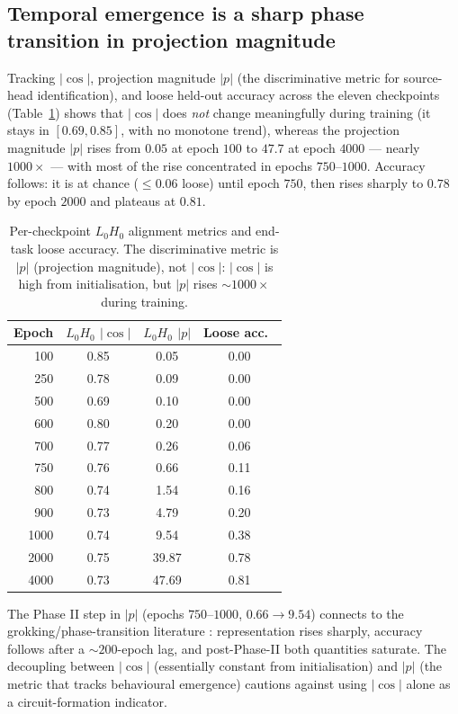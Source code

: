 \documentclass{article}
\theoremstyle{plain}
\theoremstyle{definition}
\begin{document}
\subsection{Temporal emergence is a sharp phase transition in projection magnitude}
\label{sec:emergence}

Tracking $|\cos|$, projection magnitude $|p|$ (the discriminative metric for source-head identification), and loose held-out accuracy across the eleven checkpoints (Table~\ref{tab:temporal}) shows that $|\cos|$ does \emph{not} change meaningfully during training (it stays in $[0.69, 0.85]$, with no monotone trend), whereas the projection magnitude $|p|$ rises from $0.05$ at epoch $100$ to $47.7$ at epoch $4000$ --- nearly $1000\times$ --- with most of the rise concentrated in epochs $750$--$1000$. Accuracy follows: it is at chance ($\leq 0.06$ loose) until epoch $750$, then rises sharply to $0.78$ by epoch $2000$ and plateaus at $0.81$.

\begin{table}[t]
\centering
\small
\caption{Per-checkpoint $L_0H_0$ alignment metrics and end-task loose accuracy. The discriminative metric is $|p|$ (projection magnitude), not $|\cos|$: $|\cos|$ is high from initialisation, but $|p|$ rises $\sim\!1000\times$ during training.}
\label{tab:temporal}
\begin{tabular}{rccc}
\toprule
Epoch & $L_0H_0$ $|\cos|$ & $L_0H_0$ $|p|$ & Loose acc.\ \\
\midrule
100  & 0.85 &  0.05 & 0.00 \\
250  & 0.78 &  0.09 & 0.00 \\
500  & 0.69 &  0.10 & 0.00 \\
600  & 0.80 &  0.20 & 0.00 \\
700  & 0.77 &  0.26 & 0.06 \\
750  & 0.76 &  0.66 & 0.11 \\
800  & 0.74 &  1.54 & 0.16 \\
900  & 0.73 &  4.79 & 0.20 \\
1000 & 0.74 &  9.54 & 0.38 \\
2000 & 0.75 & 39.87 & 0.78 \\
4000 & 0.73 & 47.69 & 0.81 \\
\bottomrule
\end{tabular}
\end{table}

The Phase II step in $|p|$ (epochs $750$--$1000$, $0.66\to 9.54$) connects to the grokking/phase-transition literature \citep{nanda2023progress}: representation rises sharply, accuracy follows after a $\sim\!200$-epoch lag, and post-Phase-II both quantities saturate. The decoupling between $|\cos|$ (essentially constant from initialisation) and $|p|$ (the metric that tracks behavioural emergence) cautions against using $|\cos|$ alone as a circuit-formation indicator.
\end{document}
